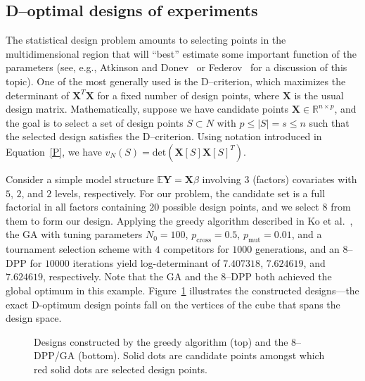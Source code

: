 \documentclass[]{interact}
\theoremstyle{plain}%
\theoremstyle{definition}
\theoremstyle{remark}
\newcommand{\matr}[1]{\bm{#1}}
\begin{document}
\subsection{D--optimal designs of experiments}
The statistical design problem amounts to selecting points in the multidimensional region that
will ``best'' estimate some important function of the parameters (see, e.g., Atkinson and Donev~\cite{Atkinson} or Federov~\cite{Federov} for a discussion of this topic). One of the most generally used is the D--criterion, which maximizes the determinant of $\matr{X}^T\matr{X}$ for a fixed number of design points, where $\matr{X}$ is the usual design matrix. Mathematically, suppose we have candidate points $\matr{X} \in \mathbb{R}^{n \times p}$, and the goal is to select a set of design points $S \subset N$ with $p \leq |S|=s \leq n$ such that the selected design satisfies the D--criterion. Using notation introduced in Equation~\eqref{P}, we have $v_N(S) = \text{det}(\matr{X}[S]\matr{X}[S]^T)$. 

Consider a simple model structure $\mathbb{E}\matr{Y} = \matr{X}\beta$ involving $3$ (factors) covariates with $5$, $2$, and $2$ levels, respectively. For our problem, the candidate set is a full factorial in all factors containing $20$ possible design points, and we select $8$ from them to form our design. Applying the greedy algorithm described in Ko et al.~\cite{KO1995}, the GA with tuning parameters $N_0 = 100$, $p_{\text{cross}} = 0.5$, $p_{\text{mut}} = 0.01$, and a tournament selection scheme with $4$ competitors for $1000$ generations, and an $8$--DPP for $10000$ iterations yield log-determinant of $7.407318$, $7.624619$, and $7.624619$, respectively. Note that the GA and the $8$--DPP both achieved the global optimum in this example. Figure~\ref{fig:Ddesigns} illustrates the constructed designs---the exact D-optimum design points fall on the vertices of the cube that spans the design space.

\begin{figure}
    \centering
    \quad
    \caption{Designs constructed by the greedy algorithm (top) and the $8$--DPP/GA (bottom). Solid dots are candidate points amongst which red solid dots are selected design points.}
    \label{fig:Ddesigns}
\end{figure}
\end{document}

